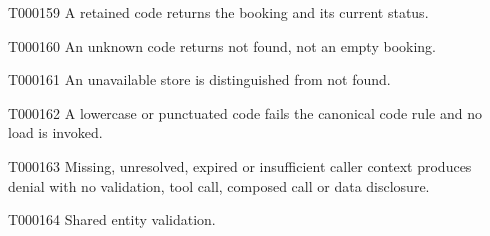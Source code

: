 \documentclass[11pt,a4paper]{article}
\begin{document}
\begin{atlasparagraph}{T000159}
A retained code returns the booking and its current status.
\end{atlasparagraph}
\begin{atlasparagraph}{T000160}
An unknown code returns not found, not an empty booking.
\end{atlasparagraph}
\begin{atlasparagraph}{T000161}
An unavailable store is distinguished from not found.
\end{atlasparagraph}
\begin{atlasparagraph}{T000162}
A lowercase or punctuated code fails the canonical code rule and no load is invoked.
\end{atlasparagraph}
\begin{atlasparagraph}{T000163}
Missing, unresolved, expired or insufficient caller context produces denial with no validation, tool call, composed call or data disclosure.
\end{atlasparagraph}
\begin{atlasparagraph}{T000164}
Shared entity validation.
\end{atlasparagraph}
\end{document}

